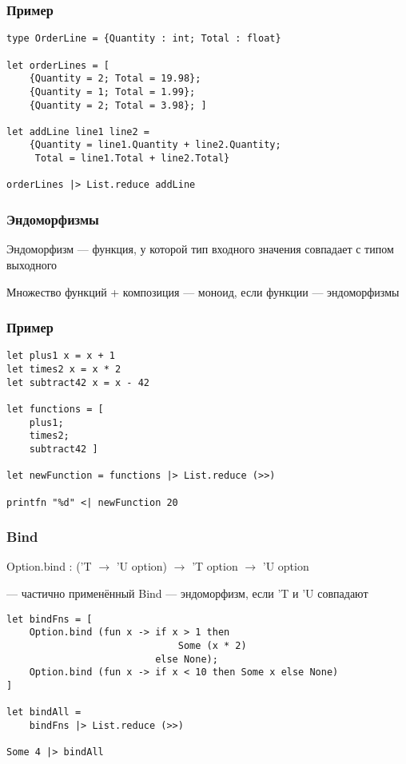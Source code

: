\documentclass[xetex,mathserif,serif]{beamer}
\begin{document}
	\begin{frame}[fragile]
		\frametitle{Пример}
		\begin{verbatim}
type OrderLine = {Quantity : int; Total : float}

let orderLines = [
    {Quantity = 2; Total = 19.98};
    {Quantity = 1; Total = 1.99};
    {Quantity = 2; Total = 3.98}; ]
    
let addLine line1 line2 =
    {Quantity = line1.Quantity + line2.Quantity; 
     Total = line1.Total + line2.Total}
     
orderLines |> List.reduce addLine
		\end{verbatim}
\end{frame}

	\begin{frame}
		\frametitle{Эндоморфизмы}
		Эндоморфизм --- функция, у которой тип входного значения совпадает с типом выходного
		
		\vspace{1cm}
		Множество функций + композиция --- моноид, если функции --- эндоморфизмы
	\end{frame}

	\begin{frame}[fragile]
		\frametitle{Пример}
		\begin{verbatim}
let plus1 x = x + 1
let times2 x = x * 2
let subtract42 x = x - 42

let functions = [
    plus1;
    times2;
    subtract42 ]

let newFunction = functions |> List.reduce (>>)

printfn "%d" <| newFunction 20
		\end{verbatim}
\end{frame}

	\begin{frame}[fragile]
		\frametitle{Bind}
		Option.bind : ('T $\to$ 'U option) $\to$ 'T option $\to$ 'U option

		--- частично применённый Bind --- эндоморфизм, если 'T и 'U совпадают
		\begin{verbatim}
let bindFns = [
    Option.bind (fun x -> if x > 1 then 
                              Some (x * 2) 
                          else None);
    Option.bind (fun x -> if x < 10 then Some x else None)
]

let bindAll = 
    bindFns |> List.reduce (>>)

Some 4 |> bindAll
		\end{verbatim}
\end{frame}
\end{document}
